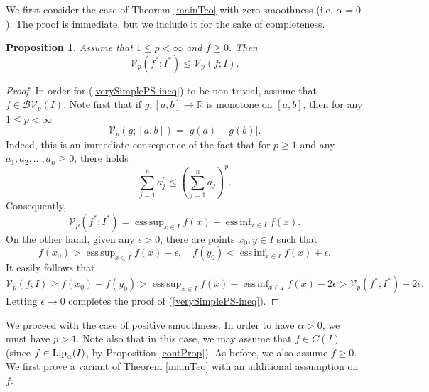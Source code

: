 \documentclass{amsart}
\newtheorem{prop}[theorem]{Proposition}
\DeclareMathOperator*{\esssup}{ess\,sup}
\DeclareMathOperator*{\essinf}{ess\,inf}
\numberwithin{equation}{section}
\begin{document}
We first consider the case of Theorem \ref{mainTeo} with zero smoothness (i.e. $\alpha=0$). The proof is immediate, but we include it for the sake of completeness.
\begin{prop}
    \label{verySimplePS}
    Assume that $1\le p<\infty$ and $f\ge0$. Then
    \begin{equation}
        \label{verySimplePS-ineq}
        \mathcal{V}_p(f^*;I^*)\le\mathcal{V}_p(f;I).
    \end{equation}
\end{prop}
\begin{proof}
    In order for (\ref{verySimplePS-ineq}) to be non-trivial, assume that $f\in\mathcal{BV}_p(I)$. 
    Note first that if $g:[a,b]\rightarrow\mathbb{R}$ is monotone on $[a,b]$, then for any $1\le p<\infty$
    \begin{equation}
        \nonumber
        \mathcal{V}_p(g;[a,b])=|g(a)-g(b)|.
    \end{equation}
    Indeed, this is an immediate consequence of the fact that for $p\ge1$ and any $a_1,a_2,\ldots, a_n\ge0$, there holds
    \begin{equation}
        \nonumber
        \sum_{j=1}^na_j^p\le\left(\sum_{j=1}^na_j\right)^p.
    \end{equation}
    Consequently,
    \begin{equation}
        \nonumber
        \mathcal{V}_p(f^*;I^*)=\esssup_{x\in I}f(x)-\essinf_{x\in I}f(x).
    \end{equation}
    On the other hand, given any $\epsilon>0$, there are points $x_0,y\in I$ such that
    \begin{equation}
        \nonumber
        f(x_0)>\esssup_{x\in I}f(x)-\epsilon,\quad f(y_0)<\essinf_{x\in I}f(x)+\epsilon.
    \end{equation}
    It easily follows that
    \begin{equation}
        \nonumber
        \mathcal{V}_p(f;I)\ge f(x_0)-f(y_0)>\esssup_{x\in I}f(x)-\essinf_{x\in I}f(x)-2\epsilon>\mathcal{V}_p(f^*;I^*)-2\epsilon.
    \end{equation}
    Letting $\epsilon\rightarrow0$ completes the proof of (\ref{verySimplePS-ineq}).
\end{proof}
We proceed with the case of positive smoothness. In order to have $\alpha>0$, we must have $p>1$. Note also that in this case, we may assume that $f\in C(I)$ (since $f\in{\rm Lip}_\alpha(I)$, by Proposition \ref{contProp}). As before, we also assume $f\ge0$. 
We first prove a variant of Theorem \ref{mainTeo} with an additional assumption on $f$.
\end{document}
